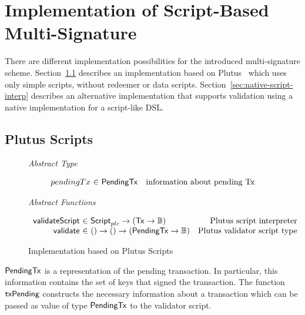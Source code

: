 \documentclass[11pt,a4paper,dvipsnames,twosided]{article}
\newcommand{\Bool}{\ensuremath{\mathbb{B}}}
\newcommand{\Tx}{\type{Tx}}
\newcommand{\Script}{\type{Script}}
\newcommand{\ScriptPlutus}{\Script_{plc}}
\newcommand{\PendingTx}{\type{PendingTx}}
\theoremstyle{definition}
\begin{document}
\section{Implementation of Script-Based Multi-Signature}
\label{sec:altern-impl}

There are different implementation possibilities for the introduced
multi-signature scheme. Section~\ref{sec:plutus-scripts} describes an
implementation based on Plutus~\cite{chakravarty2020extended} which uses only simple
scripts, without redeemer or data
scripts. Section~\ref{sec:native-script-interp} describes an alternative
implementation that supports validation using a
native implementation for a script-like DSL.

\subsection{Plutus Scripts}
\label{sec:plutus-scripts}

\begin{figure*}[hbt]
  \emph{Abstract Type}

  \begin{equation*}
    \begin{array}{r@{~\in~}lr}
      pendingTx & \PendingTx & \text{information about pending Tx}
    \end{array}
  \end{equation*}

  \emph{Abstract Functions}

  \begin{equation*}
    \begin{array}{r@{~\in~}lr}
      \fun{validateScript} & \ScriptPlutus \to (\Tx \to \Bool) & \text{Plutus script
                                                               interpreter} \\
      \fun{validate} & () \to () \to (\PendingTx \to \Bool) & \text{Plutus
                                                            validator script type}
    \end{array}
  \end{equation*}
  \caption{Implementation based on Plutus Scripts}
  \label{fig:types_defs_plutus}
\end{figure*}

$\PendingTx$ is a representation of the pending transaction. In particular, this
information contains the set of keys that signed the transaction. The function
$\mathsf{txPending}$ constructs the necessary information about a transaction
which can be passed as value of type $\PendingTx$ to the validator script.
\end{document}
